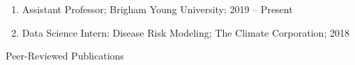 \documentclass[12pt]{article}
\newcommand{\head}[1]{ %
    \bigskip %
    \begin{large}\begin{bf}{#1}\end{bf}\end{large} %

    \ \\ [-1.3cm] %

    \hrulefill}
\begin{document}
\begin{enumerate}[label=$\bullet$]

\item Assistant Professor; Brigham Young University; 2019 -- Present


\item Data Science Intern: Disease Risk Modeling; The Climate Corporation; 2018




\end{enumerate}



%


\vspace{2mm}
\head{Peer-Reviewed Publications}
\end{document}
